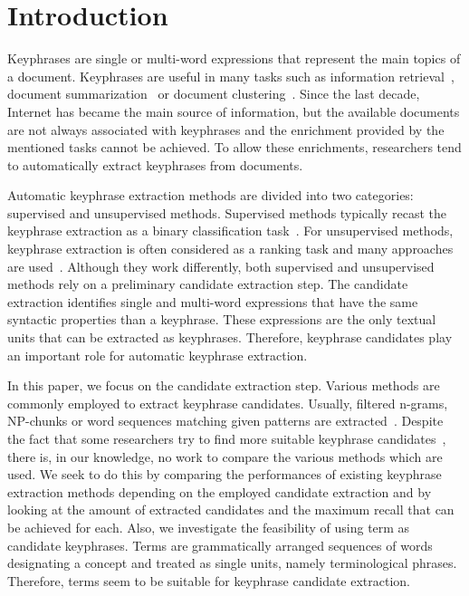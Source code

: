 \section{Introduction}
\label{sec:section}
  Keyphrases are single or multi-word expressions that represent the main topics
  of a document. Keyphrases are useful in many tasks such as information
  retrieval~\cite{medelyan2008smalltrainingset}, document
  summarization~\cite{litvak2008graphbased} or document
  clustering~\cite{han2007webdocumentclustering}. Since the last decade,
  Internet has became the main source of information, but the available
  documents are not always associated with keyphrases and the enrichment
  provided by the mentioned tasks cannot be achieved. To allow these
  enrichments, researchers tend to automatically extract keyphrases from
  documents.

  Automatic keyphrase extraction methods are divided into two categories:
  supervised and unsupervised methods. Supervised methods typically recast the
  keyphrase extraction as a binary classification task~\cite{witten1999kea}.
  For unsupervised methods, keyphrase extraction is often considered as a
  ranking task and many approaches are
  used~\cite{barker2000nounphrasehead,mihalcea2004textrank}. Although they work
  differently, both supervised and unsupervised methods rely on a preliminary
  candidate extraction step. The candidate extraction identifies single and
  multi-word expressions that have the same syntactic properties than a
  keyphrase. These expressions are the only textual units that can be extracted
  as keyphrases. Therefore, keyphrase candidates play an important role for
  automatic keyphrase extraction.
  
  In this paper, we focus on the candidate extraction step. Various methods are
  commonly employed to extract keyphrase candidates. Usually, filtered n-grams,
  NP-chunks or word sequences matching given patterns are
  extracted~\cite{hulth2003keywordextraction}. Despite the fact that some
  researchers try to find more suitable keyphrase
  candidates~\cite{hulth2003keywordextraction,kim2009reexaminingautomatickeyphraseextraction},
  there is, in our knowledge, no work to compare the various methods which are
  used. We seek to do this by comparing the performances of existing keyphrase
  extraction methods depending on the employed candidate extraction and by
  looking at the amount of extracted candidates and the maximum recall that can
  be achieved for each. Also, we investigate the feasibility of using term as
  candidate keyphrases. Terms are grammatically arranged sequences of words
  designating a concept and treated as single units, namely terminological
  phrases. Therefore, terms seem to be suitable for keyphrase candidate
  extraction.

